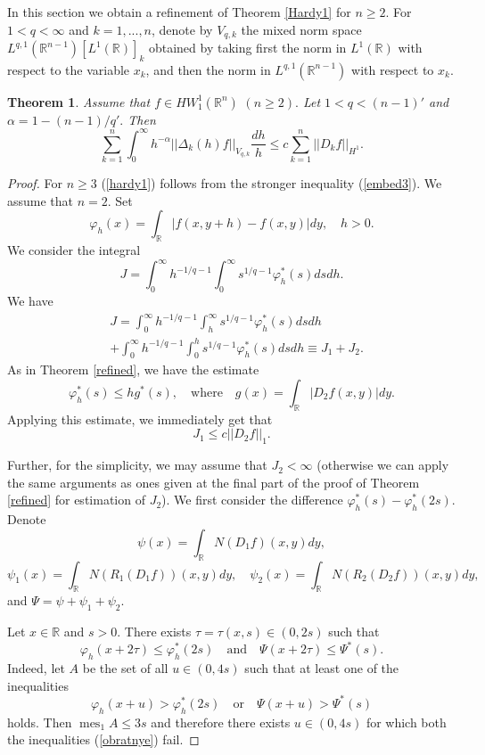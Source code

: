 \documentclass[12pt,twoside,reqno]{amsart}
\numberwithin{equation}{section}
\newtheorem{teo}{Theorem}[section]
\theoremstyle{definition}
\numberwithin{equation}{section}
\def\a{\alpha}
\def\R{\mathbb{R}}
\def\f{\varphi}
\def\mes{\operatorname{mes}}
\begin{document}
In this section we obtain a refinement of Theorem \ref{Hardy1} for $n\ge 2.$ For $1<q<\infty$ and $k=1,...,n$, denote by $V_{q,k}$
the mixed norm space
$L^{q,1}(\R^{n-1})[L^1(\R)]_k$
obtained by taking first the norm in $L^1(\R)$ with respect to the variable $x_k$, and then the norm in $L^{q,1}(\R^{n-1})$ with respect to $\widehat x_k.$
\begin{teo}\label{Hardy2} Assume that  $f\in HW_1^1(\R^n)\,\,(n\ge 2).$ Let $1<q<(n-1)'$ and $\a=1-(n-1)/q'.$  Then
\begin{equation}\label{hardy1}
\sum_{k=1}^n\int_0^\infty h^{-\a}||\Delta_k(h)f||_{V_{q,k}}\frac{dh}{h}\le c \sum_{k=1}^n||D_kf||_{H^1}.
\end{equation}
\end{teo}
\begin{proof} For $n\ge 3$ (\ref{hardy1}) follows from the stronger inequality (\ref{embed3}). We assume that $n=2.$ Set
$$
\f_h(x)=\int_\R|f(x,y+h)-f(x,y)|dy,\quad h>0.
$$
We consider the integral
\begin{equation}\label{hardy0}
J=\int_0^\infty h^{-1/q-1}\int_0^\infty s^{1/q-1}\f_h^*(s)dsdh.
\end{equation}
 We have
$$
\begin{aligned}
&J= \int_0^\infty h^{-1/q-1}\int_h^\infty s^{1/q-1}\f_h^*(s)dsdh\\
&+ \int_0^\infty h^{-1/q-1}\int_0^h s^{1/q-1}\f_h^*(s)dsdh\equiv J_1+J_2.
\end{aligned}
$$
As in Theorem \ref{refined}, we have the estimate
\begin{equation}\label{hardy2}
\f_h^*(s)\le hg^*(s), \quad \mbox{where}\quad g(x)=\int_\R|D_2f(x,y)|dy.
\end{equation}
Applying this estimate, we immediately get that
\begin{equation}\label{hardy3}
J_1\le c ||D_2f||_1.
\end{equation}

 Further, for the simplicity, we may assume that $J_2<\infty$ (otherwise we can apply the same  arguments as ones given  at the final part of the proof of Theorem \ref{refined} for estimation of $J_2$).
We first consider the difference $\f_h^*(s)-\f_h^*(2s).$
Denote
$$
\psi(x)=\int_\R N(D_1f)(x,y)dy,
$$
$$
 \psi_1(x)=\int_\R N(R_1(D_1f))(x,y)dy, \quad \psi_2(x)=\int_\R N(R_2(D_2f))(x,y)dy,
$$
and
$\Psi=\psi+\psi_1+\psi_2.$

Let $x\in \R$ and $s>0.$ There exists $\tau=\tau(x,s)\in (0,2s)$ such that
\begin{equation}\label{hardy4}
\f_h(x+2\tau)\le \f_h^*(2s) \quad\mbox{and}\quad \Psi(x+2\tau)\le \Psi^*(s).
\end{equation}
Indeed, let $A$ be the set of all $u\in (0, 4s)$ such that at least one of the inequalities
\begin{equation}\label{obratnye}
\f_h(x+u)> \f_h^*(2s) \quad\mbox{or}\quad \Psi(x+u)> \Psi^*(s)
\end{equation}
holds. Then $\mes_1 A\le 3s$ and therefore there exists $u\in (0, 4s)$ for which both the inequalities (\ref{obratnye}) fail.


\end{proof}
\end{document}
